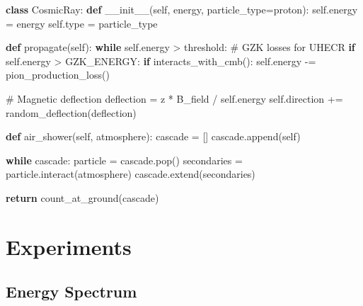 \documentclass[
  11pt,
  letterpaper,
  twoside,
  openright]{book}
\newenvironment{Shaded}{\begin{snugshade}}{\end{snugshade}}
\newcommand{\BuiltInTok}[1]{\textcolor[rgb]{0.00,0.23,0.31}{#1}}
\newcommand{\CommentTok}[1]{\textcolor[rgb]{0.37,0.37,0.37}{#1}}
\newcommand{\ControlFlowTok}[1]{\textcolor[rgb]{0.00,0.23,0.31}{\textbf{#1}}}
\newcommand{\FunctionTok}[1]{\textcolor[rgb]{0.28,0.35,0.67}{#1}}
\newcommand{\KeywordTok}[1]{\textcolor[rgb]{0.00,0.23,0.31}{\textbf{#1}}}
\newcommand{\NormalTok}[1]{\textcolor[rgb]{0.00,0.23,0.31}{#1}}
\newcommand{\OperatorTok}[1]{\textcolor[rgb]{0.37,0.37,0.37}{#1}}
\newcommand{\StringTok}[1]{\textcolor[rgb]{0.13,0.47,0.30}{#1}}
\newcommand{\VariableTok}[1]{\textcolor[rgb]{0.07,0.07,0.07}{#1}}
\begin{document}
\begin{Shaded}
\begin{Highlighting}[]
\KeywordTok{class}\NormalTok{ CosmicRay:}
    \KeywordTok{def} \FunctionTok{\_\_init\_\_}\NormalTok{(}\VariableTok{self}\NormalTok{, energy, particle\_type}\OperatorTok{=}\StringTok{\textquotesingle{}proton\textquotesingle{}}\NormalTok{):}
        \VariableTok{self}\NormalTok{.energy }\OperatorTok{=}\NormalTok{ energy}
        \VariableTok{self}\NormalTok{.}\BuiltInTok{type} \OperatorTok{=}\NormalTok{ particle\_type}

    \KeywordTok{def}\NormalTok{ propagate(}\VariableTok{self}\NormalTok{):}
        \ControlFlowTok{while} \VariableTok{self}\NormalTok{.energy }\OperatorTok{\textgreater{}}\NormalTok{ threshold:}
            \CommentTok{\# GZK losses for UHECR}
            \ControlFlowTok{if} \VariableTok{self}\NormalTok{.energy }\OperatorTok{\textgreater{}}\NormalTok{ GZK\_ENERGY:}
                \ControlFlowTok{if}\NormalTok{ interacts\_with\_cmb():}
                    \VariableTok{self}\NormalTok{.energy }\OperatorTok{{-}=}\NormalTok{ pion\_production\_loss()}

            \CommentTok{\# Magnetic deflection}
\NormalTok{            deflection }\OperatorTok{=}\NormalTok{ z }\OperatorTok{*}\NormalTok{ B\_field }\OperatorTok{/} \VariableTok{self}\NormalTok{.energy}
            \VariableTok{self}\NormalTok{.direction }\OperatorTok{+=}\NormalTok{ random\_deflection(deflection)}

    \KeywordTok{def}\NormalTok{ air\_shower(}\VariableTok{self}\NormalTok{, atmosphere):}
\NormalTok{        cascade }\OperatorTok{=}\NormalTok{ []}
\NormalTok{        cascade.append(}\VariableTok{self}\NormalTok{)}

        \ControlFlowTok{while}\NormalTok{ cascade:}
\NormalTok{            particle }\OperatorTok{=}\NormalTok{ cascade.pop()}
\NormalTok{            secondaries }\OperatorTok{=}\NormalTok{ particle.interact(atmosphere)}
\NormalTok{            cascade.extend(secondaries)}

        \ControlFlowTok{return}\NormalTok{ count\_at\_ground(cascade)}
\end{Highlighting}
\end{Shaded}

\section{Experiments}\label{experiments-35}

\subsection{Energy Spectrum}\label{energy-spectrum}
\end{document}
